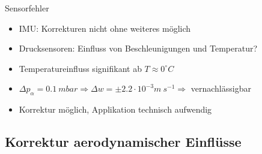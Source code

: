\documentclass[ucs,9pt]{beamer}
\begin{document}
\begin{frame}{Sensorfehler}
	\begin{itemize}
		\item<1-> IMU: Korrekturen nicht ohne weiteres möglich
		\item<2-> Drucksensoren: Einfluss von Beschleunigungen und Temperatur?
	\end{itemize}
	\begin{itemize}
		\item<3-> Temperatureinfluss signifikant ab $T\approx0^\circ C$
		\item<4-> $\Delta p_{\alpha}=0.1\ mbar \Rightarrow \Delta w = \pm 2.2\cdot 10^{-3} m\ s^{-1} \Rightarrow$ vernachlässigbar
		\item<5-> Korrektur möglich, Applikation technisch aufwendig
	\end{itemize}
\end{frame}

\subsection{Korrektur aerodynamischer Einflüsse}
\end{document}
